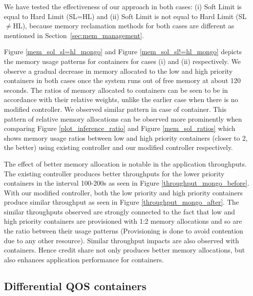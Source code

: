       We have tested the effectiveness of our approach in both cases: (i) Soft Limit is equal to Hard Limit (SL=HL) and (ii) Soft Limit is not 
equal to Hard  Limit (SL$\neq$HL), because memory reclamation methods for both cases are different as mentioned in Section~\ref{sec:mem_management}. 

Figure \ref{mem_sol_sl=hl_mongo} and Figure \ref{mem_sol_sl!=hl_mongo} depicts the memory usage patterns for \mongodb{} containers for cases 
(i) and (ii) respectively. We observe a gradual decrease in memory allocated to the low and high priority containers in both cases once the 
system runs out of free memory at about 120 seconds. The ratios of memory allocated to containers can be seen to be in accordance with
their relative weights, unlike the earlier case when there is no modified controller.
We observed similar pattern in case of \redis{} container. 
This pattern of relative memory allocations can be observed more prominently when comparing Figure \ref{plot_inference_ratio} and Figure \ref{mem_sol_ratios} 
which shows memory usage ratios between low and high priority containers (closer to 2, the better) using existing controller and our 
modified controller respectively.

The effect of better memory allocation is notable in the application throughputs. The existing controller produces better throughputs 
for the lower priority \mongodb{} containers in the interval 100-200s as seen in Figure \ref{throughput_mongo_before}. With our modified 
controller, both the low priority and high priority containers produce similar throughput as seen in Figure \ref{throughput_mongo_after}. 
The similar throughputs observed are strongly connected to the fact that low and high priority containers are provisioned with 1:2 memory 
allocations and so are the ratio between their usage patterns (Provisioning is done to avoid contention due to any other resource). Similar 
throughput impacts are also observed with \redis{} containers. Hence credit share not only produces better memory allocations, but also 
enhances application performance for containers.
    
    \subsection{Differential QOS containers}
    
